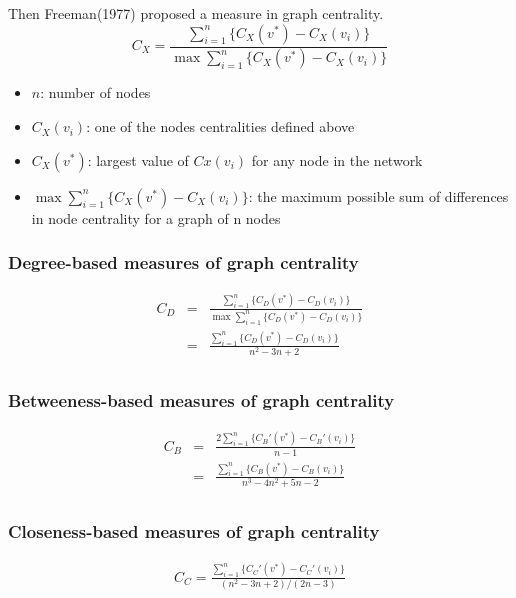 \documentclass{beamer}
\begin{document}
\begin{frame}
Then Freeman(1977) proposed a measure in graph centrality.
\color{iseblue}
\begin{equation}
C_X=\frac{\sum_{i=1}^n\{C_X(v^*)-C_X(v_i)\}}{\max\sum_{i=1}^n\{C_X(v^*)-C_X(v_i)\}}	
\end{equation}
\begin{itemize}
	\item $n$: number of nodes
	\item $C_X(v_i)$: one of the nodes centralities defined above
	\item $C_X(v^*)$: largest value of $Cx(v_i)$ for any node in the network
	\item $\max \sum_{i=1}^n\{C_X(v^*)-C_X(v_i)\}$: the maximum possible sum of differences in node centrality for a graph of n nodes
\end{itemize}		
\end{frame}


\begin{frame}
\frametitle{Degree-based measures of graph centrality}
\color{iseblue}	
\begin{eqnarray*}
	C_D &=&\frac{\sum_{i=1}^n\{C_D(v^*)-C_D(v_i)\}}{\max\sum_{i=1}^n\{C_D(v^*)-C_D(v_i)\}} \\
	 &=& \frac{\sum_{i=1}^n\{C_D(v^*)-C_D(v_i)\}}{n^2-3n+2}\\
\end{eqnarray*}
\end{frame}

\begin{frame}
	\frametitle{Betweeness-based measures of graph centrality}
	\color{iseblue}
	\begin{eqnarray*}
		C_B &=& \frac{2\sum_{i=1}^n\{C_B'(v^*)-C_B'(v_i)\}}{n-1}\\
		&=& \frac{\sum_{i=1}^n\{C_B(v^*)-C_B(v_i)\}}{n^3-4n^2+5n-2}\\
	\end{eqnarray*}
\end{frame}

\begin{frame}
	\frametitle{Closeness-based measures of graph centrality}
	\color{iseblue}
	\begin{eqnarray*}
		C_C = \frac{\sum_{i=1}^n\{C_C'(v^*)-C_C'(v_i)\}}{(n^2-3n+2)/(2n-3)}\\
	\end{eqnarray*}
\end{frame}

\end{document}
